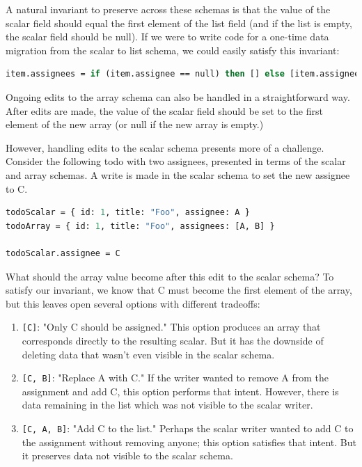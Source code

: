 \documentclass[english,submission]{programming}
\begin{document}
A natural invariant to preserve across these schemas is that the value of the scalar field should equal the first element of the list field (and if the list is empty, the scalar field should be null). If we were to write code for a one-time data migration from the scalar to list schema, we could easily satisfy this invariant:

\begin{lstlisting}[language=ml]
item.assignees = if (item.assignee == null) then [] else [item.assignee]
\end{lstlisting}

Ongoing edits to the array schema can also be handled in a straightforward way. After edits are made, the value of the scalar field should be set to the first element of the new array (or null if the new array is empty.)

However, handling edits to the scalar schema presents more of a challenge. Consider the following todo with two assignees, presented in terms of the scalar and array schemas. A write is made in the scalar schema to set the new assignee to C.

\begin{lstlisting}[language=ml]
todoScalar = { id: 1, title: "Foo", assignee: A }
todoArray = { id: 1, title: "Foo", assignees: [A, B] }

todoScalar.assignee = C
\end{lstlisting}

What should the array value become after this edit to the scalar schema? To satisfy our invariant, we know that C must become the first element of the array, but this leaves open several options with different tradeoffs:

\begin{enumerate}
  \item \texttt{[C]}: "Only C should be assigned." This option produces an array that corresponds directly to the resulting scalar. But it has the downside of deleting data that wasn't even visible in the scalar schema.
  \item \texttt{[C, B]}: "Replace A with C." If the writer wanted to remove A from the assignment and add C, this option performs that intent. However, there is data remaining in the list which was not visible to the scalar writer.
  \item \texttt{[C, A, B]}: "Add C to the list." Perhaps the scalar writer wanted to add C to the assignment without removing anyone; this option satisfies that intent. But it preserves data not visible to the scalar schema.
\end{enumerate}
\end{document}
